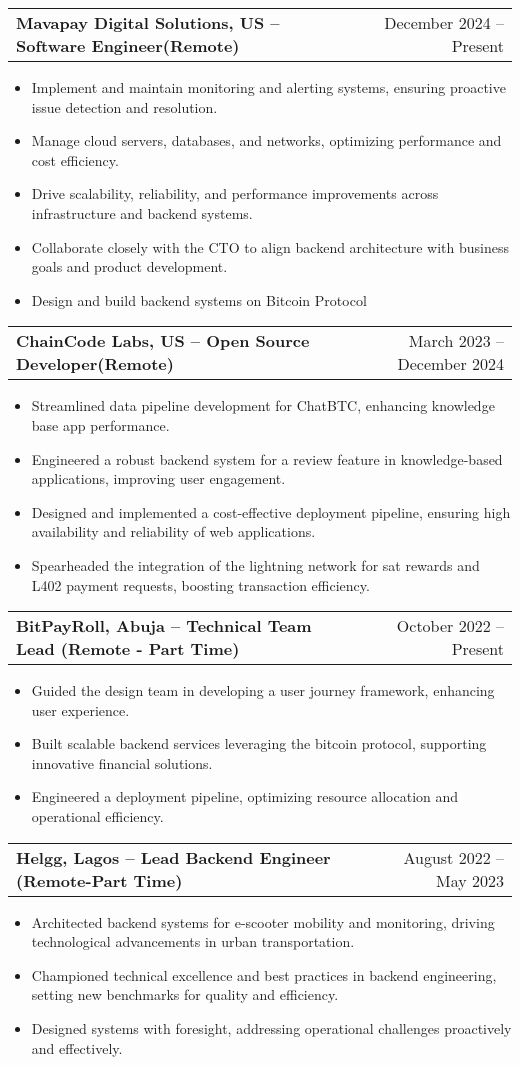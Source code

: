 \documentclass[a4paper,12pt]{article}
\makeatletter
\newenvironment{joblong}[2]
    {
    \begin{tabularx}{\linewidth}{@{}l X r@{}}
    \textbf{#1} & \hfill &  #2 \\[3.75pt]
    \end{tabularx}
    \begin{minipage}[t]{\linewidth}
    \begin{itemize}[nosep,after=\strut, leftmargin=1em, itemsep=3pt,label=--]
    }
    {
    \end{itemize}
    \end{minipage}    
    }
\makeatother
\begin{document}
\begin{joblong}{Mavapay Digital Solutions, US -- Software Engineer(Remote)}{December 2024 -- Present}
\item Implement and maintain monitoring and alerting systems, ensuring proactive issue detection and resolution.
\item Manage cloud servers, databases, and networks, optimizing performance and cost efficiency.
\item Drive scalability, reliability, and performance improvements across infrastructure and backend systems.
\item Collaborate closely with the CTO to align backend architecture with business goals and product development.
\item Design and build backend systems on Bitcoin Protocol
\end{joblong}


\begin{joblong}{ChainCode Labs, US -- Open Source Developer(Remote)}{March 2023 -- December 2024}
\item Streamlined data pipeline development for ChatBTC, enhancing knowledge base app performance.
\item Engineered a robust backend system for a review feature in knowledge-based applications, improving user engagement.
\item Designed and implemented a cost-effective deployment pipeline, ensuring high availability and reliability of web applications.
\item Spearheaded the integration of the lightning network for sat rewards and L402 payment requests, boosting transaction efficiency.
\end{joblong}

\begin{joblong}{BitPayRoll, Abuja -- Technical Team Lead (Remote - Part Time)}{October 2022 -- Present}
\item Guided the design team in developing a user journey framework, enhancing user experience.
\item Built scalable backend services leveraging the bitcoin protocol, supporting innovative financial solutions.
\item Engineered a deployment pipeline, optimizing resource allocation and operational efficiency.
\end{joblong}

\begin{joblong}{Helgg, Lagos -- Lead Backend Engineer (Remote-Part Time)}{August 2022 -- May 2023}
\item Architected backend systems for e-scooter mobility and monitoring, driving technological advancements in urban transportation.
\item Championed technical excellence and best practices in backend engineering, setting new benchmarks for quality and efficiency.
\item Designed systems with foresight, addressing operational challenges proactively and effectively.
\end{joblong}
\end{document}
